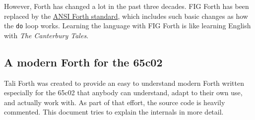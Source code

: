 However, Forth has changed a lot in the past three decades. FIG Forth has been
replaced by the \href{https://forth-standard.org/}{ANSI Forth
standard}, which includes such basic changes as how the
\texttt{do} loop works. Learning the language with FIG Forth is like learning
English with \textit{The Canterbury Tales}.


\subsection{A modern Forth for the 65c02}

Tali Forth was created to provide an easy to understand modern Forth written
especially for the 65c02 that anybody can understand, adapt to their own use,
and actually work with. As part of that effort, the source code is heavily
commented. This document tries to explain the internals in more detail.

